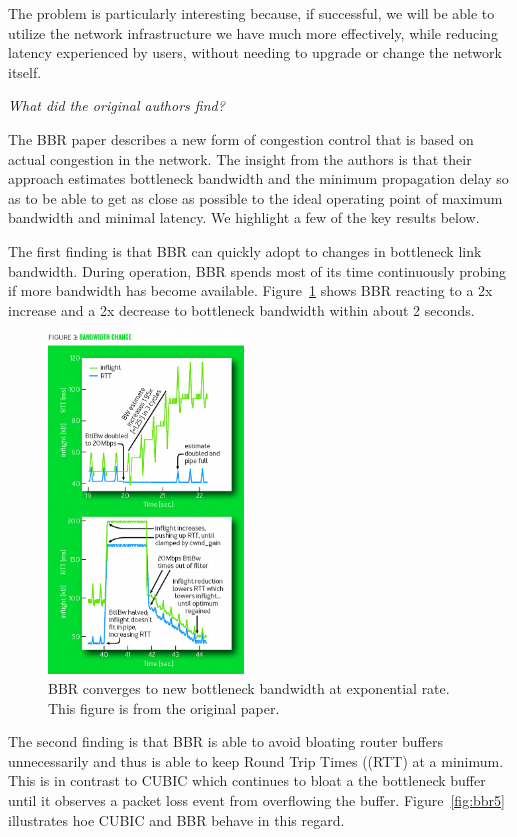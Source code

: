 The problem is particularly interesting because, if successful, we will be able
to utilize the network infrastructure we have much more effectively, while
reducing latency experienced by users, without needing to upgrade or change
the network itself.

\emph{What did the original authors find?}

The BBR paper describes a new form of congestion control that is based on actual
congestion in the network. The insight from the authors is that their
approach estimates bottleneck bandwidth and the minimum propagation delay
so as to be able to get as close as possible to the ideal operating point of
maximum bandwidth and minimal latency. We highlight a few of the key
results below.

The first finding is that BBR can quickly adopt to changes in bottleneck link
bandwidth. During operation, BBR spends most of its time continuously probing
if more bandwidth has become available. Figure~\ref{fig:bbr3} shows BBR
reacting to a 2x increase and a 2x decrease to bottleneck bandwidth within
about 2 seconds.

\begin{figure}[h]
  \centering
  \includegraphics[height=9cm]{./img/bbr_fig3.png}
  \caption{BBR converges to new bottleneck bandwidth at exponential rate.
  This figure is from the original paper.}
  \label{fig:bbr3}
\end{figure}

The second finding is that BBR is able to avoid bloating router buffers
unnecessarily and thus is able to keep Round Trip Times ((RTT) at a minimum. This is in contrast to
CUBIC which continues to bloat a the bottleneck buffer until it observes a
packet loss event from overflowing the buffer. Figure~\ref{fig:bbr5} illustrates
hoe CUBIC and BBR behave in this regard.

